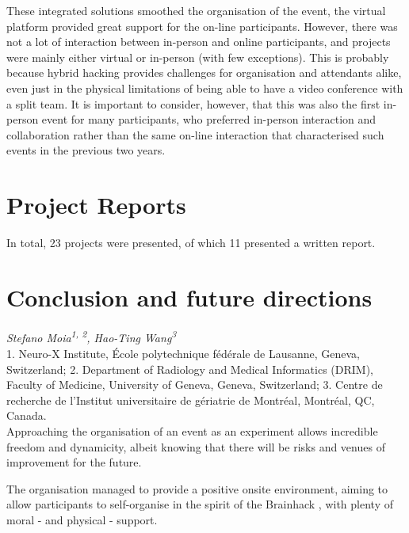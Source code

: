 \documentclass[10pt,a4paper,twocolumns]{proc}
\newcommand{\authors}[1]{\emph{\footnotesize #1} \\}
\newcommand{\affiliations}[1]{{\scriptsize #1} \\}
\begin{document}
These integrated solutions smoothed the organisation of the event, the
virtual platform provided great support for the on-line participants.
However, there was not a lot of interaction between in-person and online
participants, and projects were mainly either virtual or in-person (with
few exceptions). This is probably because hybrid hacking provides
challenges for organisation and attendants alike, even just in the
physical limitations of being able to have a video conference with a
split team. It is important to consider, however, that this was also the
first in-person event for many participants, who preferred in-person
interaction and collaboration rather than the same on-line interaction
that characterised such events in the previous two years.

\section{Project Reports}

In total, 23 projects were presented, of which 11 presented a written
report.













\section{Conclusion and future directions}
\authors{Stefano Moia\textsuperscript{1, 2}, %
Hao-Ting Wang\textsuperscript{3}}
%
\affiliations{1. Neuro-X Institute, École polytechnique fédérale de Lausanne, Geneva, Switzerland; %
2. Department of Radiology and Medical Informatics (DRIM), Faculty of Medicine, University of Geneva, Geneva, Switzerland; %
3. Centre de recherche de l'Institut universitaire de gériatrie de Montréal, Montréal, QC, Canada.}


Approaching the organisation of an event as an experiment allows
incredible freedom and dynamicity, albeit knowing that there will be
risks and venues of improvement for the future.

The organisation managed to provide a positive onsite environment,
aiming to allow participants to self-organise in the spirit of the
Brainhack \parencite{Gau2021}, with plenty of moral - and physical - support.
\end{document}
